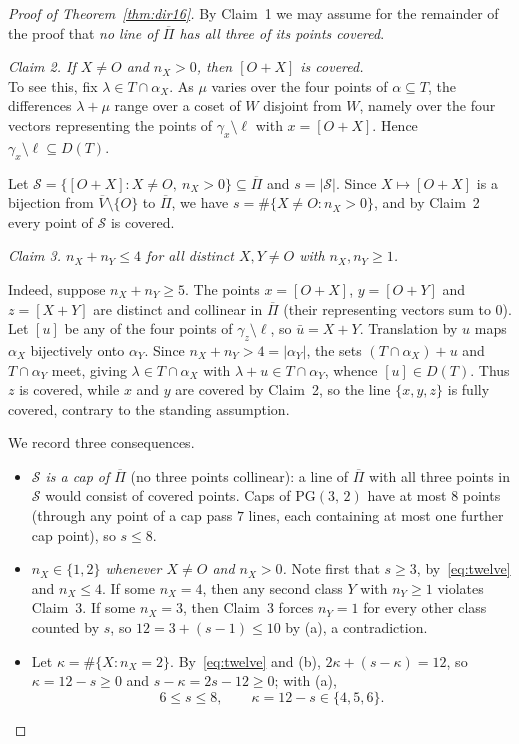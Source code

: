 \documentclass[10pt,a4paper]{amsart}
\newcommand{\PG}[2]{\mathrm{PG}(#1,\,#2)}
\newcommand{\SSS}{\mathcal{S}}
\newcommand{\la}{\lambda}
\begin{document}
\begin{proof}[Proof of Theorem~\ref{thm:dir16}]
\smallskip
By Claim~1 we may assume for the remainder of the proof that \emph{no line of $\overline\Pi$ has all three of its points covered}.

\smallskip
\noindent\textit{Claim 2.  If $X\neq O$ and $n_X>0$, then $[O+X]$ is covered.}\\
To see this, fix $\la\in T\cap\alpha_X$.  As $\mu$ varies over the four points of $\alpha\subseteq T$, the differences $\la+\mu$ range over a coset of $W$ disjoint from $W$, namely over the four vectors representing the points of $\gamma_x\setminus\ell$ with $x=[O+X]$.  Hence $\gamma_x\setminus\ell\subseteq D(T)$.

\smallskip
Let $\SSS=\{[O+X] : X\neq O,\ n_X>0\}\subseteq\overline\Pi$ and $s=|\SSS|$.  Since $X\mapsto[O+X]$ is a bijection from $\overline V\setminus\{O\}$ to $\overline\Pi$, we have $s=\#\{X\neq O : n_X>0\}$, and by Claim~2 every point of $\SSS$ is
covered.

\smallskip
\noindent\textit{Claim 3.  $n_X+n_Y\le4$ for all distinct $X,Y\neq O$ with $n_X,n_Y\ge1$.}

Indeed, suppose $n_X+n_Y\ge5$.  The points $x=[O+X]$, $y=[O+Y]$ and $z=[X+Y]$ are distinct and collinear in $\overline\Pi$ (their representing vectors sum to $0$).  Let $[u]$ be any of the four points of $\gamma_z\setminus\ell$, so $\bar u=X+Y$.  Translation by $u$ maps $\alpha_X$ bijectively onto $\alpha_Y$. Since $n_X+n_Y>4=|\alpha_Y|$, the sets $(T\cap\alpha_X)+u$ and $T\cap\alpha_Y$ meet, giving $\la\in T\cap\alpha_X$ with $\la+u\in T\cap\alpha_Y$, whence $[u]\in D(T)$.  Thus $z$ is covered, while $x$ and $y$ are covered by Claim~2, so the line $\{x,y,z\}$ is fully covered, contrary to the standing assumption.

\smallskip
We record three consequences.
\begin{itemize}
\item[(a)] \textit{$\SSS$ is a cap of $\overline\Pi$} (no three points collinear): a line of $\overline\Pi$ with all three points in $\SSS$ would consist of covered points.  Caps of $\PG32$ have at most $8$ points (through any point of a cap pass $7$ lines, each containing at most one further cap point), so $s\le8$.
\item[(b)] \textit{$n_X\in\{1,2\}$ whenever $X\neq O$ and $n_X>0$.} Note first that $s\ge3$, by~\eqref{eq:twelve} and $n_X\le4$.  If some $n_X=4$, then any second class $Y$ with $n_Y\ge1$ violates Claim~3.  If some $n_X=3$, then Claim~3 forces $n_Y=1$ for every other class counted by $s$, so $12=3+(s-1)\le10$ by (a), a contradiction. \item[(c)] Let $\kappa=\#\{X : n_X=2\}$.  By~\eqref{eq:twelve} and (b), $2\kappa+(s-\kappa)=12$, so $\kappa=12-s\ge0$ and $s-\kappa=2s-12\ge0$; with (a), 
\begin{equation}\label{eq:srange}
6\le s\le 8,\qquad \kappa=12-s\in\{4,5,6\}.
\end{equation}
\end{itemize}


\end{proof}
\end{document}
